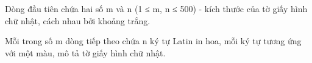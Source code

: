 Dòng đầu tiên chứa hai số m và n (1 ≤ m, n ≤ 500) - kích thước của tờ giấy hình chữ nhật, cách nhau bởi khoảng trắng.  

   Mỗi trong số m dòng tiếp theo chứa n ký tự Latin in hoa, mỗi ký tự tương ứng với một màu, mô tả tờ giấy hình chữ nhật.